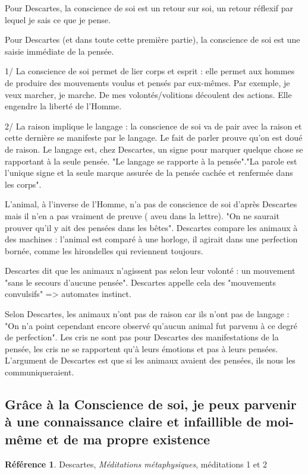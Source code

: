 \documentclass[french]{book}
\theoremstyle{definition}
\newtheorem*{refe}{Référence}
\begin{document}
Pour Descartes, la conscience de soi est un retour sur soi, un retour réflexif par lequel je sais ce que je pense.

Pour Descartes (et dans toute cette première partie), la conscience de soi est une saisie immédiate de la pensée.

1/ La conscience de soi permet de lier corps et esprit : elle permet aux hommes de produire des mouvements voulus et pensés par eux-mêmes. Par exemple, je veux marcher, je marche. De mes volontés/volitions découlent des actions. Elle engendre la liberté de l'Homme.

2/ La raison implique le langage : la conscience de soi va de pair avec la raison et cette dernière se manifeste par le langage. Le fait de parler prouve qu'on est doué de raison. Le langage est, chez Descartes, un signe pour marquer quelque chose se rapportant à la seule pensée. "Le langage se rapporte à la pensée"."La parole est l'unique signe et la seule marque assurée de la pensée cachée et renfermée dans les corps".

L'animal, à l'inverse de l'Homme, n'a pas de conscience de soi d'après Descartes mais il n'en a pas vraiment de preuve ( aveu dans la lettre). "On ne saurait prouver qu'il y ait des pensées dans les bêtes". Descartes compare les animaux à des machines : l'animal est comparé à une horloge, il agirait dans une perfection bornée, comme les hirondelles qui reviennent toujours.

Descartes dit que les animaux n'agissent pas selon leur volonté : un mouvement "sans le secours d'aucune pensée". Descartes appelle cela des "mouvements convulsifs" => automates instinct. 

Selon Descartes, les animaux n'ont pas de raison car ils n'ont pas de langage : "On n'a point cependant encore observé qu'aucun animal fut parvenu à ce degré de perfection". Les cris ne sont pas pour Descartes des manifestations de la pensée, les cris ne se rapportent qu'à leurs émotions et pas à leurs pensées. L'argument de Descartes est que si les animaux avaient des pensées, ils nous les communiqueraient.

\subsection{Grâce à la Conscience de soi, je peux parvenir à une connaissance claire et infaillible de moi-même et de ma propre existence}

\begin{refe}
	Descartes, \textit{Méditations métaphysiques}, méditations 1 et 2
\end{refe}
\end{document}
